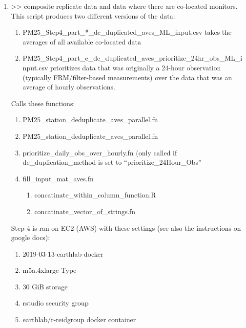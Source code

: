 \begin{enumerate}[nolistsep]

\item {} >> composite replicate data and data where there are co-located monitors. This script produces two different versions of the data:   %
\begin{enumerate}
\item PM25\_Step4\_part\_*\_de\_duplicated\_aves\_ML\_input.csv takes the averages of all available co-located data
\item PM25\_Step4\_part\_e\_de\_duplicated\_aves\_prioritize\_24hr\_obs\_ML\_input.csv prioritizes data that was originally a 24-hour observation (typically FRM/filter-based measurements) over the data that was an average of hourly observations. 
\end{enumerate}

 Calls these functions:
  \begin{enumerate}
  \item PM25\_station\_deduplicate\_aves\_parallel.fn%
  \item PM25\_station\_deduplicate\_aves\_parallel.fn
  \item prioritize\_daily\_obs\_over\_hourly.fn (only called if de\_duplication\_method is set to ``prioritize\_24Hour\_Obs''
  \item fill\_input\_mat\_aves.fn %
    \begin{enumerate}
    \item concatinate\_within\_column\_function.R
    \item concatinate\_vector\_of\_strings.fn
    \end{enumerate}
  \end{enumerate}

Step 4 is ran on EC2 (AWS) with these settings (see also the instructions on google docs):
\begin{enumerate}
\item 2019-03-13-earthlab-docker
\item m5a.4xlarge Type
\item 30 GiB storage 
\item rstudio security group
\item earthlab/r-reidgroup docker container
\end{enumerate}


\end{enumerate}
